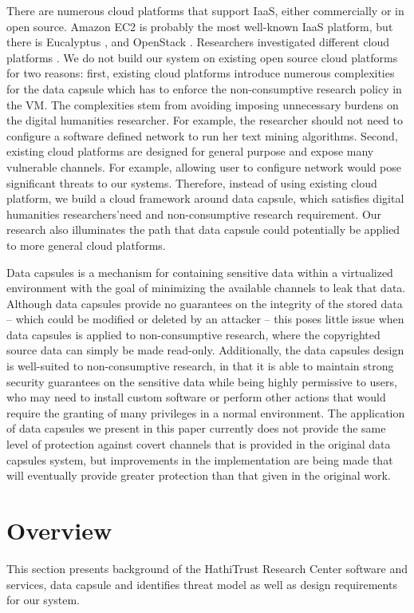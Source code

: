 \documentclass{acm_proc_article-sp}
\begin{document}
There are numerous cloud platforms that support IaaS, either commercially or in open source. Amazon EC2 \cite{EC2} is probably the most well-known IaaS platform, but there is Eucalyptus \cite{Nurmi:2009:EOC:1577849.1577895}, and OpenStack \cite{OpenStack}. Researchers investigated different cloud platforms \cite{Sempolinski:cloud,vonLaszewski:2012:CMC:2353730.2353779}. We do not build our system on existing open source cloud platforms for two reasons: first, existing cloud platforms introduce numerous complexities for the data capsule which has to enforce the non-consumptive research policy in the VM. The complexities stem from avoiding imposing unnecessary burdens on the digital humanities researcher. For example, the researcher should not need to configure a software defined network to run her text mining algorithms. Second, existing cloud platforms are designed for general purpose and expose many vulnerable channels. For example, allowing user to configure network would pose significant threats to our systems. Therefore, instead of using existing cloud platform, we build a cloud framework around data capsule, which satisfies digital humanities researchers\rq need and non-consumptive research requirement. Our research also illuminates the path that data capsule could potentially be applied to more general cloud platforms.

Data capsules \cite{Borders:2009:PCD:1855768.1855791} is a mechanism for
containing sensitive data within a virtualized environment with the goal of
minimizing the available channels to leak that data.  Although data capsules
provide no guarantees on the integrity of the stored data -- which could be
modified or deleted by an attacker -- this poses little issue when data 
capsules is applied to non-consumptive research, where the copyrighted source
data can simply be made read-only.  Additionally, the data capsules design
is well-suited to non-consumptive research, in that it is able to maintain
strong security guarantees on the sensitive data while being highly permissive
to users, who may need to install custom software or perform other actions that
would require the granting of many privileges in a normal environment.  The
application of data capsules we present in this paper currently does not
provide the same level of protection against covert channels that is provided
in the original data capsules system, but improvements in the implementation
are being made that will eventually provide greater protection than that given
in the original work.

\section{Overview} \label{title:overview}
This section presents background of the HathiTrust Research Center software and services, data capsule and identifies threat model as well as design requirements for our system.
\end{document}
